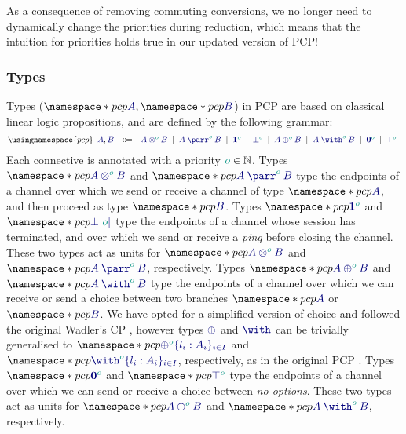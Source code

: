 \documentclass[main.tex]{subfiles}
\begin{document}
As a consequence of removing commuting conversions, we no longer need to dynamically change the priorities during reduction, which means that the intuition for priorities holds true in our updated version of PCP!



\subsubsection*{Types}
Types ($\pcp{\ty{A}}, \pcp{\ty{B}}$) in PCP are based on classical linear logic propositions, and are defined by the following grammar:
\[
  \usingnamespace{pcp}
  \begin{array}{lcl}
    \ty{A}, \ty{B}
    & \Coloneqq & \ty{\tytens[\cs{o}]{A}{B}}
      \sep        \ty{\typarr[\cs{o}]{A}{B}}
      \sep        \ty{\tyone[\cs{o}]}
      \sep        \ty{\tybot[\cs{o}]}
      \sep        \ty{\typlus[\cs{o}]{A}{B}}
      \sep        \ty{\tywith[\cs{o}]{A}{B}}
      \sep        \ty{\tynil[\cs{o}]}
      \sep        \ty{\tytop[\cs{o}]}
  \end{array}
\]
Each connective is annotated with a priority $\cs{o}\in\mathbb{N}$.
Types $\pcp{\ty{\tytens[\cs{o}]{A}{B}}}$ and $\pcp{\ty{\typarr[\cs{o}]{A}{B}}}$ type the endpoints of a channel over which we send or receive a channel of type $\pcp{\ty{A}}$, and then proceed as type $\pcp{\ty{B}}$. Types $\pcp{\ty{\tyone[\cs{o}]}}$ and $\pcp{\ty{{\tybot}[\cs{o}]}}$ type the endpoints of a channel whose session has terminated, and over which we send or receive a \emph{ping} before closing the channel. These two types act as units for $\pcp{\ty{\tytens[\cs{o}]{A}{B}}}$ and $\pcp{\ty{\typarr[\cs{o}]{A}{B}}}$, respectively.
Types $\pcp{\ty{\typlus[\cs{o}]{A}{B}}}$ and $\pcp{\ty{\tywith[\cs{o}]{A}{B}}}$ type the endpoints of a channel over which we can receive or send a choice between two branches $\pcp{\ty{A}}$ or $\pcp{\ty{B}}$. We have opted for a simplified version of choice and followed the original Wadler's CP \cite{wadler14}, however types $\ty{\oplus}$ and $\ty{\with}$ can be trivially generalised to $\pcp{\ty{\oplus^{\cs{o}}\{l_i:A_i\}_{i\in I}}}$ and $\pcp{\ty{\with^{\cs{o}}\{l_i:A_i\}_{i\in I}}}$, respectively, as in the original PCP \cite{dardhagay18}.
Types $\pcp{\ty{\tynil[\cs{o}]}}$ and $\pcp{\ty{\tytop[\cs{o}]}}$ type the endpoints of a channel over which we can send or receive a choice between \emph{no options}. These two types act as units for $\pcp{\ty{\typlus[\cs{o}]{A}{B}}}$ and $\pcp{\ty{\tywith[\cs{o}]{A}{B}}}$, respectively.
\end{document}
